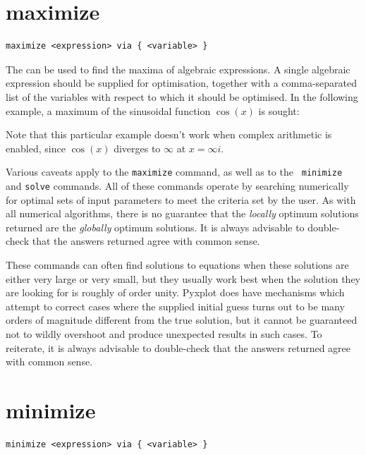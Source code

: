 \section{maximize}

\begin{verbatim}
maximize <expression> via { <variable> }
\end{verbatim}

The  can be used to find the maxima of algebraic expressions.
A single algebraic expression should be supplied for optimisation, together
with a comma-separated list of the variables with respect to which it should be
optimised.  In the following example, a maximum of the sinusoidal function
$\cos(x)$ is sought:

\vspace{3mm}

\vspace{3mm}

\noindent Note that this particular example doesn't work when complex
arithmetic is enabled, since $\cos(x)$ diverges to $\infty$ at $x=\infty i$.

Various caveats apply to the {\tt maximize} command, as well as to the {\tt
minimize} and {\tt solve} commands.  All of these commands operate by searching
numerically for optimal sets of input parameters to meet the criteria set by
the user. As with all numerical algorithms, there is no guarantee that the {\it
locally} optimum solutions returned are the {\it globally} optimum solutions.
It is always advisable to double-check that the answers returned agree with
common sense.

These commands can often find solutions to equations when these solutions are
either very large or very small, but they usually work best when the solution
they are looking for is roughly of order unity.  Pyxplot does have mechanisms
which attempt to correct cases where the supplied initial guess turns out to be
many orders of magnitude different from the true solution, but it cannot be
guaranteed not to wildly overshoot and produce unexpected results in such
cases.  To reiterate, it is always advisable to double-check that the answers
returned agree with common sense.


\section{minimize}

\begin{verbatim}
minimize <expression> via { <variable> }
\end{verbatim}

